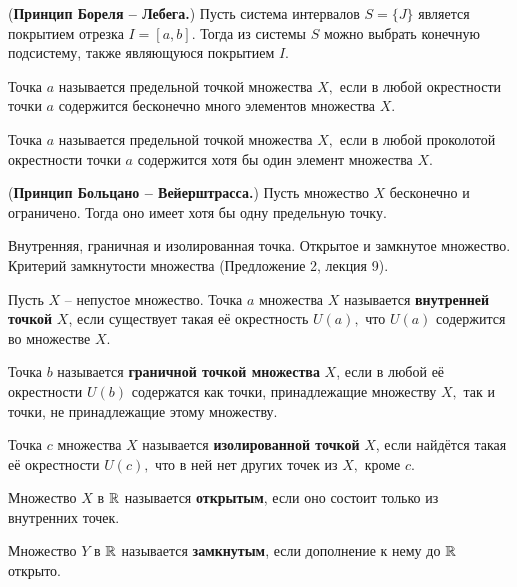 \begin{theorem} (\textbf{Принцип Бореля -- Лебега.})
	Пусть система интервалов $S=\{J\}$ является покрытием
	отрезка $I=[a, b].$ Тогда из системы $S$ можно
	выбрать конечную подсистему, также являющуюся
	покрытием $I.$
\end{theorem}

\begin{definition}
	Точка $a$ называется предельной
	точкой множества $X,$ если в любой
	окрестности точки $a$ содержится
	бесконечно много элементов множества
	$X.$
\end{definition}

\begin{definition}
	Точка $a$ называется предельной
	точкой множества $X,$ если в любой
	проколотой окрестности точки $a$ содержится
	хотя бы один элемент множества
	$X.$
\end{definition}

\begin{theorem} (\textbf{Принцип Больцано -- Вейерштрасса.})
	Пусть множество $X$ бесконечно и ограничено. Тогда оно
	имеет хотя бы одну предельную точку.
\end{theorem}


\newpage
\begin{problem}
Внутренняя, граничная и изолированная точка. Открытое и замкнутое множество.
Критерий замкнутости множества (Предложение 2, лекция 9).
\end{problem}

\begin{definition}
	Пусть $X$ -- непустое множество. Точка $a$
	множества $X$ называется \textbf{внутренней
		точкой} $X$,
	если существует такая её окрестность $U(a),$
	что $U(a)$ содержится во множестве $X.$

	Точка $b$ называется
	\textbf{граничной точкой множества} $X$,
	если в любой её окрестности $U(b)$ содержатся как
	точки, принадлежащие множеству
	$X,$ так и точки, не
	принадлежащие этому множеству.

	Точка $c$ множества $X$ называется
	\textbf{изолированной точкой} $X$,
	если найдётся такая её окрестности $U(c),$
	что в ней нет других точек из $X,$ кроме $c.$
\end{definition}

\begin{definition}
	Множество $X$ в $\mathbb{R}$ называется \textbf{открытым},
	если оно состоит только из внутренних
	точек.

	Множество $Y$ в $\mathbb{R}$ называется \textbf{замкнутым},
	если дополнение к нему до $\mathbb{R}$ открыто.
\end{definition}

